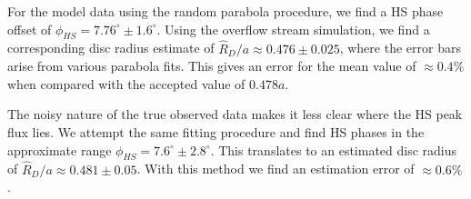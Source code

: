 \documentclass[preprint2]{aastex}
\newcommand{\note}[1]{[$\blacktriangleright$~\textbf{#1}~$\blacktriangleleft$]}
\begin{document}
For the model data using the random parabola procedure, we find a HS phase offset of $\phi_{HS} = 7.76^{\circ} \pm 1.6^{\circ}$. Using the overflow stream simulation, we find a corresponding disc radius estimate of $\hat{R}_D/a \approx 0.476 \pm 0.025$, where the error bars arise from various parabola fits. This gives an error for the mean value of $\approx 0.4 \%$ when compared with the accepted value of $0.478a$.

The noisy nature of the true observed data makes it less clear where the HS peak flux lies. We attempt the same fitting procedure and find HS phases in the approximate range $\phi_{HS} = 7.6^{\circ} \pm 2.8^{\circ}$. This translates to an estimated disc radius of $\hat{R}_D/a \approx 0.481 \pm 0.05$. With this method we find an estimation error of $\approx 0.6\%$.




\end{document}
